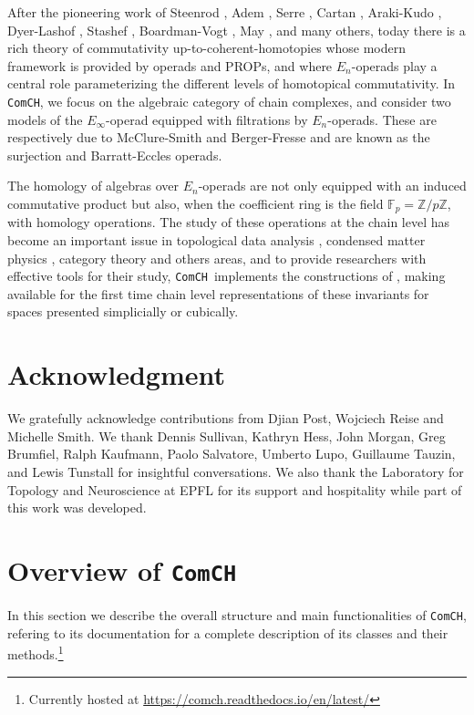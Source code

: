 \documentclass{amsart}
\newcommand{\comch}{\texttt{ComCH}}
\begin{document}
After the pioneering work of Steenrod \cite{Steenrod47, Steenrod62}, Adem \cite{Adem52}, Serre \cite{Serre53}, Cartan \cite{Cartan55}, Araki-Kudo \cite{ArakiKudo56}, Dyer-Lashof \cite{DyerLashof62}, Stashef \cite{Stasheff63}, Boardman-Vogt \cite{BoardmanVogt73}, May \cite{May70algebraic, May72geometry}, and many others, today there is a rich theory of commutativity up-to-coherent-homotopies whose modern framework is provided by operads and PROPs, and where $E_n$-operads play a central role parameterizing the different levels of homotopical commutativity. In \comch, we focus on the algebraic category of chain complexes, and consider two models of the $E_\infty$-operad equipped with filtrations by $E_n$-operads. These are respectively due to McClure-Smith \cite{McClureSmith03} and Berger-Fresse \cite{BergerFresse04} and are known as the surjection and Barratt-Eccles operads.

The homology of algebras over $E_n$-operads are not only equipped with an induced commutative product but also, when the coefficient ring is the field $\mathbb F_p = \mathbb Z/ p\mathbb Z$, with homology operations. The study of these operations at the chain level has become an important issue in topological data analysis \cite{medina2018persistence}, condensed matter physics \cite{kapustin2017fermionic}, category theory \cite{medina2020globular} and others areas, and to provide researchers with effective tools for their study, \comch\, implements the constructions of \cite{medina2020chain}, making available for the first time chain level representations of these invariants for spaces presented simplicially or cubically.

\tableofcontents

\section*{Acknowledgment}
We gratefully acknowledge contributions from Djian Post, Wojciech Reise and Michelle Smith. We thank Dennis Sullivan, Kathryn Hess, John Morgan, Greg Brumfiel, Ralph Kaufmann, Paolo Salvatore, Umberto Lupo, Guillaume Tauzin, and Lewis Tunstall for insightful conversations. We also thank the Laboratory for Topology and Neuroscience at EPFL for its support and hospitality while part of this work was developed.

\section{Overview of \comch}
In this section we describe the overall structure and main functionalities of \comch, refering to its documentation for a complete description of its classes and their methods.\footnote{Currently hosted at \url{https://comch.readthedocs.io/en/latest/}}
\end{document}
